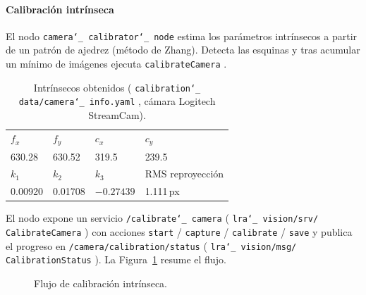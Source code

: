 \documentclass[12pt,a4paper]{article}
\newcommand{\code}[1]{%
  \begingroup
  \def\_{\char`_\penalty0 }%
  \def\/{\char`/\penalty0 }%
  \texttt{\small #1}%
  \endgroup}
\begin{document}
\paragraph{Calibración intrínseca}
\label{sec:calib-intrinseca}

El nodo \code{camera\_calibrator\_node} estima los parámetros intrínsecos a partir
de un patrón de ajedrez (método de Zhang). Detecta las esquinas y tras acumular un mínimo de imágenes
ejecuta \code{calibrateCamera}.

\begin{table}[H]
\centering
\caption{Intrínsecos obtenidos (\code{calibration\_data/camera\_info.yaml}, cámara Logitech StreamCam).}
\label{tab:intrinsecos}
\small
\begin{tabular}{@{}llll@{}}
\toprule
$f_x$ & $f_y$ & $c_x$ & $c_y$\\
630.28 & 630.52 & 319.5 & 239.5\\
\midrule
$k_1$ & $k_2$ & $k_3$ & RMS reproyección\\
0.00920 & 0.01708 & $-0.27439$ & 1.111\,px\\
\bottomrule
\end{tabular}
\end{table}

\begin{sloppypar}
El nodo expone un servicio \code{/calibrate\_camera}
(\code{lra\_vision/srv/ CalibrateCamera}) con acciones
\code{start}\slash\code{capture}\slash\code{calibrate}\slash\code{save} y publica el progreso en
\code{/camera/calibration/status} (\code{lra\_vision/msg/ CalibrationStatus}). La Figura~\ref{fig:calib-flujo} resume el flujo.
\end{sloppypar}

\begin{figure}[H]
\centering
{}
\caption{Flujo de calibración intrínseca.}
\label{fig:calib-flujo}
\end{figure}
\end{document}
